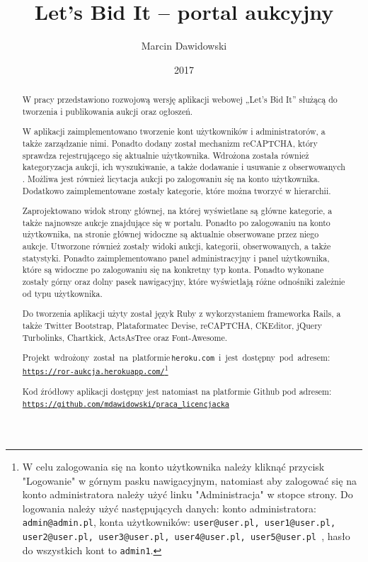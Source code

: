 \documentclass[brudnopis]{xmgr}
\author   {Marcin Dawidowski}
\title    {Let’s Bid It – portal aukcyjny}
\date     {2017}
\begin{document}
\begin{abstract}
  W pracy przedstawiono rozwojową wersję aplikacji webowej „Let's Bid It” służącą do tworzenia i publikowania aukcji oraz ogłoszeń.

  W aplikacji zaimplementowano tworzenie kont użytkowników i administratorów, a także zarządzanie nimi. Ponadto dodany został mechanizm reCAPTCHA, który sprawdza rejestrującego się aktualnie użytkownika.  Wdrożona została również kategoryzacja aukcji, ich wyszukiwanie, a także dodawanie i usuwanie z obserwowanych . Możliwa jest również licytacja aukcji po zalogowaniu się na konto użytkownika. Dodatkowo zaimplementowane zostały kategorie, które można tworzyć w hierarchii.

  Zaprojektowano widok strony głównej, na której wyświetlane są główne kategorie, a także najnowsze aukcje znajdujące się w portalu. Ponadto po zalogowaniu na konto użytkownika, na stronie głównej widoczne są aktualnie obserwowane przez niego aukcje. Utworzone również zostały widoki aukcji, kategorii, obserwowanych, a także statystyki. Ponadto zaimplementowano panel administracyjny i panel użytkownika, które są widoczne po zalogowaniu się na konkretny typ konta. Ponadto wykonane zostały górny oraz dolny pasek nawigacyjny, które wyświetlają różne odnośniki zależnie od typu użytkownika.

  Do tworzenia aplikacji użyty został język Ruby z wykorzystaniem frameworka Rails, a także Twitter Bootstrap, Plataformatec Devise, reCAPTCHA, CKEditor, jQuery Turbolinks, Chartkick, ActsAsTree oraz Font-Awesome.

\mbox{Projekt wdrożony został na platformie\, \\\texttt{heroku.com} i jest dostępny pod adresem:} \\\texttt{\url{https://ror-aukcja.herokuapp.com/}}\footnote{W celu zalogowania się na konto użytkownika należy kliknąć przycisk "Logowanie" w górnym pasku nawigacyjnym, natomiast aby zalogować się na konto administratora należy użyć linku "Administracja" w stopce strony. Do logowania należy użyć następujących danych: konto administratora: \texttt{admin@admin.pl}, konta użytkowników: \texttt{user@user.pl, user1@user.pl, user2@user.pl, user3@user.pl, user4@user.pl, user5@user.pl }, hasło do wszystkich kont to \texttt{admin1}.}

Kod źródłowy aplikacji dostępny jest natomiast na platformie Github pod adresem: \\\texttt{\url{https://github.com/mdawidowski/praca_licencjacka}}


\end{abstract}
\end{document}
